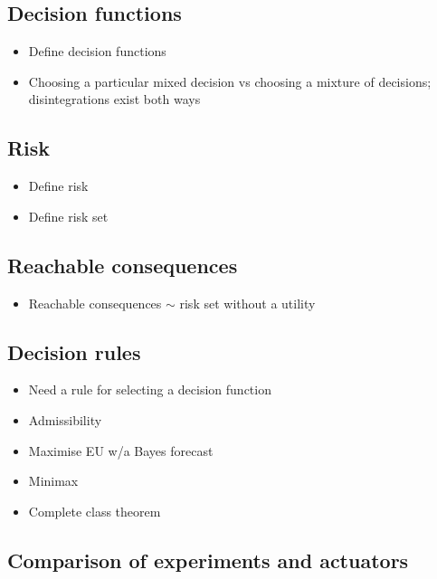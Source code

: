\subsection{Decision functions}

\begin{itemize}
    \item Define decision functions
    \item Choosing a particular mixed decision vs choosing a mixture of decisions; disintegrations exist both ways
\end{itemize}

\subsection{Risk}

\begin{itemize}
    \item Define risk
    \item Define risk set
\end{itemize}

\subsection{Reachable consequences}

\begin{itemize}
    \item Reachable consequences $\sim$ risk set without a utility
\end{itemize}

\subsection{Decision rules}

\begin{itemize}
    \item Need a rule for selecting a decision function
    \item Admissibility
    \item Maximise EU w/a Bayes forecast
    \item Minimax
    \item Complete class theorem
\end{itemize}

\subsection{Comparison of experiments and actuators}

